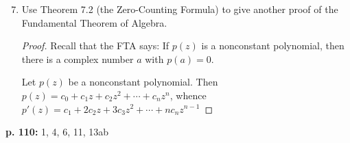 \documentclass[11pt,oneside,english]{amsart}
\theoremstyle{definition}
\begin{document}
\begin{enumerate}[leftmargin=*]
\setcounter{enumi}{6}
\item Use Theorem 7.2 (the Zero-Counting Formula) to give another proof of the Fundamental Theorem of Algebra.

\begin{proof}
Recall that the FTA says: If $p(z)$ is a nonconstant polynomial, then there is a complex number $a$ with $p(a)=0$.

Let $p(z)$ be a nonconstant polynomial. Then $p(z)=c_0+c_1z+c_2z^2+\cdots+c_nz^n$, whence $p'(z)=c_1+2c_2z+3c_3z^2+\cdots +nc_nz^{n-1}$
\end{proof}



\end{enumerate}

\pagebreak

\textbf{p. 110:} 1, 4, 6, 11, 13ab
\end{document}
